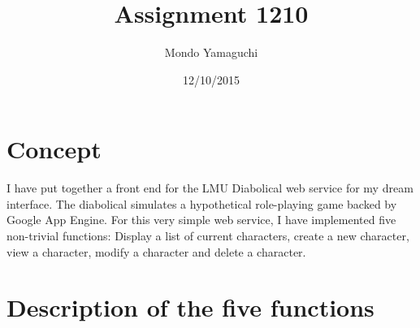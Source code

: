 \documentclass[100pt]{article}
\title{\Large{Assignment 1210}}
\author{\Large{Mondo Yamaguchi}}
\date{\Large{12/10/2015}}
\begin{document}
\maketitle


\section{\Large{Concept}}
\large{
I have put together a front end for the LMU Diabolical web service for my dream interface. The diabolical simulates a hypothetical role-playing game backed by Google App Engine. For this very simple web service, I have implemented five non-trivial functions: Display a list of current characters, create a new character, view a character, modify a character and delete a character. 
}

\section{\Large{Description of the five functions}}
\end{document}

